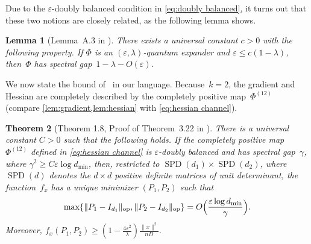 \documentclass[aos]{imsart}
\newtheorem{theorem}{Theorem}[section]
\newtheorem{lemma}[theorem]{Lemma}
\theoremstyle{definition}
\numberwithin{equation}{section}
\DeclareMathOperator{\op}{op}
\DeclareMathOperator{\SSPD}{SPD}
\DeclarePairedDelimiter{\norm}{\lVert}{\rVert}
\newcommand{\eps}{\varepsilon}
\newcommand{\AR}[1]{{\color{orange}[AR: #1]}}
\newcommand{\AR}[1]{{}}
\begin{document}
Due to the $\eps$-doubly balanced condition in \cref{eq:doubly balanced}, it turns out that these two notions are closely related, as the following lemma shows.
\begin{lemma}[Lemma~A.3 in \cite{FM20}]\label{lem:fm20}
There exists a universal constant $c>0$ with the following property.
If $\Phi$ is an $(\eps,\lambda)$-quantum expander and $\eps \leq c(1-\lambda)$, then~$\Phi$ has spectral gap~$1-\lambda-O(\eps)$.
\end{lemma}

We now state the bound of~\cite{KLR19} in our language.
Because~$k = 2$, the gradient and Hessian are completely described by the completely positive map~$\Phi^{(12)}$ (compare \cref{lem:gradient,lem:hessian} with \cref{eq:hessian channel}).

\begin{theorem}[Theorem 1.8, Proof of Theorem~3.22 in \cite{KLR19}]\label{thm:klr}
There is a universal constant $C>0$ such that the following holds.
If the completely positive map $\Phi^{(12)}$ defined in \cref{eq:hessian channel} is $\eps$-doubly balanced and has spectral gap~$\gamma$, where $\gamma^2 \geq C \eps \log d_{\min}$, then, restricted to $\SSPD(d_1) \times \SSPD(d_2)$, where $\SSPD(d)$ denotes the $d\times d$ positive definite matrices of unit determinant, the function~$f_x$ has a unique minimizer $(P_1,P_2)$ such that
\begin{align*}
  \max \{ \norm{P_1 - I_{d_1}}_{\op}, \norm{P_2 - I_{d_2}}_{\op} \} = O\Bigl(\frac{\eps \log d_{\min}}\gamma\Bigr).
\end{align*}
Moreover, $f_x(P_1, P_2) \geq (1 - \frac{4 \eps^2}{\lambda}) \frac{\|x\|^2}{nD}$.
\end{theorem}
\end{document}

